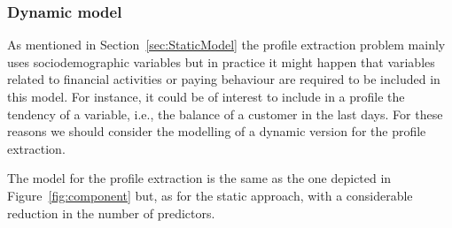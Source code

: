\subsubsection*{Dynamic model}

As mentioned in Section~\ref{sec:StaticModel} the profile extraction problem mainly uses sociodemographic variables but in practice it might happen that variables related to financial activities or paying behaviour are required to be included in this model.  For instance, it could be of interest to include in a profile the tendency of a variable, i.e., the balance of a customer in the last days. For these reasons we should consider the modelling of a dynamic version for the profile extraction. 

The model for the profile extraction is the same as the one depicted in Figure~\ref{fig:component} but, as for the static approach, with a considerable reduction in the number of predictors. 
 
%
%
%

